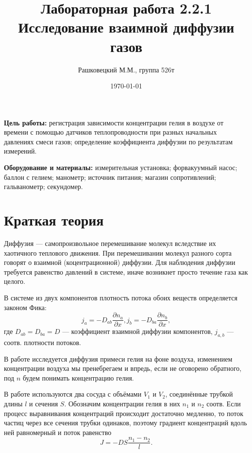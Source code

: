 \documentclass[12pt]{article}
\author{Рашковецкий М.М., группа 526т}
\date{\today}
\title{Лабораторная работа 2.2.1\\Исследование взаимной диффузии газов}
\begin{document}
	\maketitle
	
	{\parindent=1cm \hangindent=1cm \parskip=0.5cm
	{\bfseries Цель работы:} регистрация зависимости концентрации гелия в воздухе от времени с помощью датчиков теплопроводности при разных начальных давлениях смеси газов; определение коэффициента диффузии по результатам измерений.
	
	\hangindent=1cm
	{\bfseries Оборудование и материалы:} измерительная установка; форвакуумный насос; баллон с гелием; манометр; источник питания; магазин сопротивлений; гальванометр; секундомер.\par}
	\section*{Краткая теория}
	
	\indent Диффузия --- самопроизвольное перемешивание молекул вследствие их хаотичного теплового движения. При перемешивании молекул разного сорта говорят о взаимной (коцентрационной) диффузии. Для наблюдения диффузии требуется равенство давлений в системе, иначе возникнет просто течение газа как целого.
	
	В системе из двух компонентов плотность потока обоих веществ определяется законом Фика:
	\begin{equation}
		\label{eq:Fick_law}
		j_a=-D_{ab}\frac{\partial n_a}{\partial x}, j_b=-D_{ba}\frac{\partial n_b}{\partial x},
	\end{equation}
	где $D_{ab}=D_{ba}=D$ --- коэффициент взаимной диффузии компонентов, $j_{a,b}$ --- соотв. плотности потоков.
	
	В работе исследуется диффузия примеси гелия на фоне воздуха, изменением концентрации воздуха мы пренебрегаем и впредь, если не оговорено обратного, под $n$ будем понимать концентрацию гелия.
	
	В работе используются два сосуда с объёмами $V_1$ и $V_2$, соединённые трубкой длины $l$ и сечения $S$. Обозначим концентрации гелия в них $n_1$ и $n_2$ соотв. Если процесс выравнивания концентраций происходит достаточно медленно, то поток частиц через все сечения трубки одинаков, поэтому градиент концентраций вдоль ней равномерный и поток равенство
	\begin{equation}
		\label{eq:stream_tube}
		J=-DS\frac{n_1-n_2}{l}.
	\end{equation}
	
\end{document}
